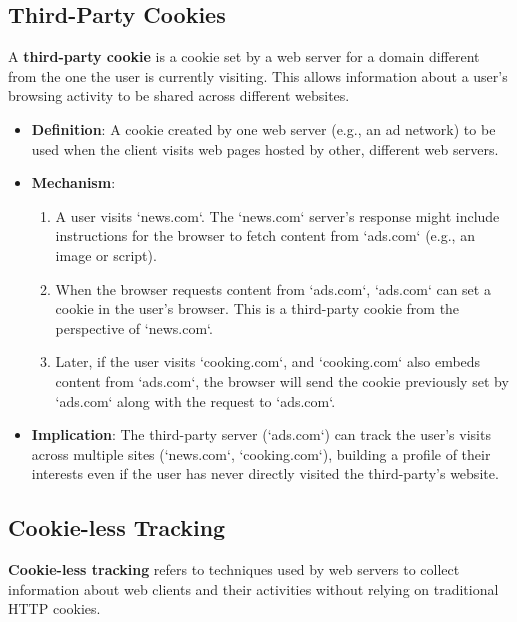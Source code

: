 \documentclass[../../compsys.tex]{subfiles}
\begin{document}
\subsection{Third-Party Cookies}
A \textbf{third-party cookie} is a cookie set by a web server for a domain different from the one the user is currently visiting. This allows information about a user's browsing activity to be shared across different websites.

\begin{itemize}
    \item \textbf{Definition}: A cookie created by one web server (e.g., an ad network) to be used when the client visits web pages hosted by other, different web servers.
    \item \textbf{Mechanism}:
    \begin{enumerate}
        \item A user visits `news.com`. The `news.com` server's response might include instructions for the browser to fetch content from `ads.com` (e.g., an image or script).
        \item When the browser requests content from `ads.com`, `ads.com` can set a cookie in the user's browser. This is a third-party cookie from the perspective of `news.com`.
        \item Later, if the user visits `cooking.com`, and `cooking.com` also embeds content from `ads.com`, the browser will send the cookie previously set by `ads.com` along with the request to `ads.com`.
    \end{enumerate}
    \item \textbf{Implication}: The third-party server (`ads.com`) can track the user's visits across multiple sites (`news.com`, `cooking.com`), building a profile of their interests even if the user has never directly visited the third-party's website.
\end{itemize}

\subsection{Cookie-less Tracking}
\textbf{Cookie-less tracking} refers to techniques used by web servers to collect information about web clients and their activities without relying on traditional HTTP cookies.
\end{document}
